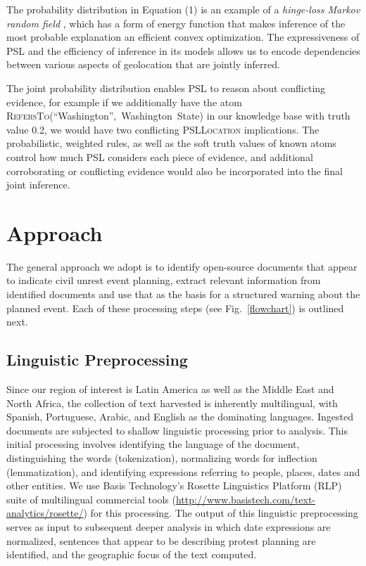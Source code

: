 \documentclass[letterpaper]{article}
\begin{document}
The probability distribution in Equation (1) is an example of a
\emph{hinge-loss Markov random field} \cite{bach:uai13}, which has a
form of energy function that makes inference of the most probable
explanation an efficient convex optimization. The expressiveness of PSL
and the efficiency of inference in its models allows us to encode
dependencies between various aspects of geolocation that are jointly
inferred.

\begin{exmp}
The joint probability distribution enables PSL to reason about
conflicting evidence, for example if we additionally have the atom
\mbox{\textsc{RefersTo}(``Washington'', Washington State)} in our
knowledge base with truth value 0.2, we would have two conflicting
\textsc{PSLLocation} implications.  The probabilistic, weighted rules,
as well as the soft truth values of known atoms control how much PSL
considers each piece of evidence, and additional corroborating or
conflicting evidence would also be incorporated into the final joint
inference.
\end{exmp}

\section{Approach}
The general approach we adopt is to identify open-source documents that
appear to indicate civil unrest event planning, extract relevant
information from identified documents and use that as the basis for a
structured warning about the planned event. 
Each of these processing steps (see Fig.~\ref{flowchart}) is outlined
next.

\begin{figure*}
\caption{Schematic of the planned protest detector that ingests five
different types of data sources.}
\label{flowchart}
\end{figure*}

\subsection{Linguistic Preprocessing}
Since our region of interest is Latin America as well as the Middle East
and North Africa, the collection of text harvested is inherently
multilingual, with Spanish, Portuguese, Arabic, and English as the
dominating languages. Ingested documents are subjected to shallow
linguistic processing prior to analysis.  This initial processing
involves identifying the language of the document, distinguishing the
words (tokenization), normalizing words for inflection (lemmatization),
and identifying expressions referring to people, places, dates and other
entities.  We use Basis Technology's Rosette Linguistics Platform (RLP)
suite of multilingual commercial tools
(\url{http://www.basistech.com/text-analytics/rosette/}) for this
processing.  The output of this linguistic preprocessing serves as input
to subsequent deeper analysis in which date expressions are normalized,
sentences that appear to be describing protest planning are identified,
and the geographic focus of the text computed.
\end{document}
